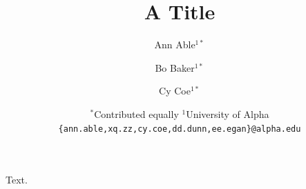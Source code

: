 \documentclass{article}
\title{A Title}
\author{%
  Ann Able$^{1*}$ \\
  \and
  Bo Baker$^{1*}$ \\
  \and
  Cy Coe$^{1*}$ \\
  \and
 {\normalfont $^*$Contributed equally} \quad
 {\normalfont $^1$University of Alpha} \\
 \texttt{\{ann.able,xq.zz,cy.coe,dd.dunn,ee.egan\}@alpha.edu}\\
}
\begin{document}
\maketitle
Text.
\end{document}

